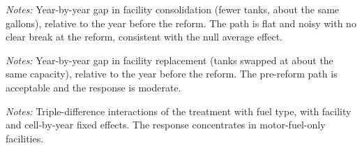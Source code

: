 \documentclass[
  12pt,
]{article}
\begin{document}
\clearpage
\null\vfill
\begin{center}
\label{fig-es-consolidate}
\par\vspace{8pt}
\par\vspace{8pt}
\begin{minipage}{0.85\textwidth}\small\textit{Notes:} Year-by-year gap in facility consolidation (fewer tanks, about the same gallons), relative to the year before the reform. The path is flat and noisy with no clear break at the reform, consistent with the null average effect.\end{minipage}
\end{center}
\vfill\clearpage

\clearpage
\null\vfill
\begin{center}
\label{fig-es-replace}
\par\vspace{8pt}
\par\vspace{8pt}
\begin{minipage}{0.85\textwidth}\small\textit{Notes:} Year-by-year gap in facility replacement (tanks swapped at about the same capacity), relative to the year before the reform. The pre-reform path is acceptable and the response is moderate.\end{minipage}
\end{center}
\vfill\clearpage

\clearpage
\null\vfill
\begin{center}
\label{tbl-hte-tank}
\vspace{6pt}
\par\vspace{10pt}
\begin{minipage}{0.85\textwidth}\small\textit{Notes:} Triple-difference interactions of the treatment with fuel type, with facility and cell-by-year fixed effects. The response concentrates in motor-fuel-only facilities.\end{minipage}
\end{center}
\vfill\clearpage
\end{document}
